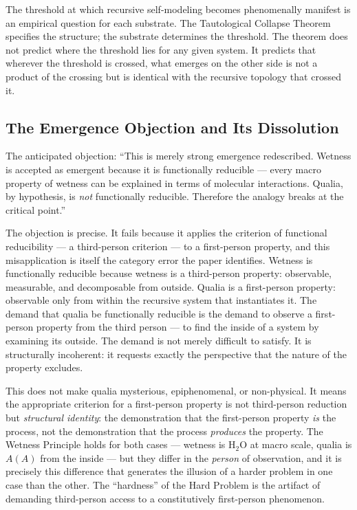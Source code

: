 \documentclass[12pt, letterpaper]{article}
\begin{document}
The threshold at which recursive self-modeling becomes phenomenally manifest is an empirical question for each substrate. The Tautological Collapse Theorem specifies the structure; the substrate determines the threshold. The theorem does not predict where the threshold lies for any given system. It predicts that wherever the threshold is crossed, what emerges on the other side is not a product of the crossing but is identical with the recursive topology that crossed it.

\subsection*{The Emergence Objection and Its Dissolution}

The anticipated objection: ``This is merely strong emergence redescribed. Wetness is accepted as emergent because it is functionally reducible --- every macro property of wetness can be explained in terms of molecular interactions. Qualia, by hypothesis, is \emph{not} functionally reducible. Therefore the analogy breaks at the critical point.''

The objection is precise. It fails because it applies the criterion of functional reducibility --- a third-person criterion --- to a first-person property, and this misapplication is itself the category error the paper identifies. Wetness is functionally reducible because wetness is a third-person property: observable, measurable, and decomposable from outside. Qualia is a first-person property: observable only from within the recursive system that instantiates it. The demand that qualia be functionally reducible is the demand to observe a first-person property from the third person --- to find the inside of a system by examining its outside. The demand is not merely difficult to satisfy. It is structurally incoherent: it requests exactly the perspective that the nature of the property excludes.

This does not make qualia mysterious, epiphenomenal, or non-physical. It means the appropriate criterion for a first-person property is not third-person reduction but \emph{structural identity}: the demonstration that the first-person property \emph{is} the process, not the demonstration that the process \emph{produces} the property. The Wetness Principle holds for both cases --- wetness is H$_2$O at macro scale, qualia is $A(A)$ from the inside --- but they differ in the \emph{person} of observation, and it is precisely this difference that generates the illusion of a harder problem in one case than the other. The ``hardness'' of the Hard Problem is the artifact of demanding third-person access to a constitutively first-person phenomenon.
\end{document}
